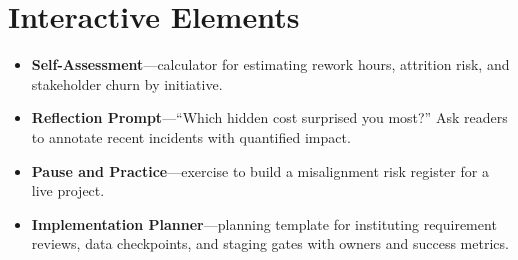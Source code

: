 \section{Interactive Elements}
\label{sec:costs-interactive}
\begin{itemize}
    \item \textbf{Self-Assessment}—calculator for estimating rework hours, attrition risk, and stakeholder churn by initiative.
    \item \textbf{Reflection Prompt}—``Which hidden cost surprised you most?'' Ask readers to annotate recent incidents with quantified impact.
    \item \textbf{Pause and Practice}—exercise to build a misalignment risk register for a live project.
    \item \textbf{Implementation Planner}—planning template for instituting requirement reviews, data checkpoints, and staging gates with owners and success metrics.
\end{itemize}
